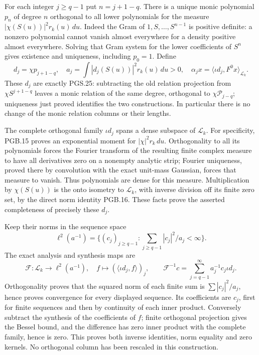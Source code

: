 For each integer $j\geq q-1$ put $n=j+1-q$. There is a unique monic
polynomial $p_n$ of degree $n$ orthogonal to all lower polynomials
for the measure $|\chi(S(u))|^2r_k(u)\,du$. Indeed the Gram of
$1,S,\ldots,S^{n-1}$ is positive definite: a nonzero polynomial
cannot vanish almost everywhere for a density positive almost
everywhere. Solving that Gram system for the lower coefficients of
$S^n$ gives existence and uniqueness, including $p_0=1$. Define
\[
 d_j=\chi p_{j+1-q},\quad
 a_j=\int|d_j(S(u))|^2r_k(u)\,du>0,\quad
 \alpha_jx=\langle\iota d_j,F^0x\rangle_{\mathscr L_k}.
\tag{PGRT.3}\label{GraphV2:eq:pgrt-relation-coefficients}
\]
These $d_j$ are exactly PGS.25: subtracting the old relation
projection from $\chi S^{j+1-q}$ leaves a monic relation of the
same degree, orthogonal to $\chi\mathcal P_{j-q}$; uniqueness
just proved identifies the two constructions. In particular
there is no change of the monic relation columns or their lengths.

The complete orthogonal family $\iota d_j$ spans a dense subspace
of $\mathscr L_k$. For specificity, PGB.15 proves an exponential
moment for $|\chi|^2r_k\,du$. Orthogonality to all its polynomials
forces the Fourier transform of the resulting finite complex
measure to have all derivatives zero on a nonempty analytic strip;
Fourier uniqueness, proved there by convolution with the exact
unit-mass Gaussian, forces that measure to vanish. Thus polynomials
are dense for this measure. Multiplication by $\chi(S(u))$ is
the onto isometry to $\mathscr L_k$, with inverse division off
its finite zero set, by the direct norm identity PGB.16. These
facts prove the asserted completeness of precisely these $d_j$.

Keep their norms in the sequence space
\[
 \ell^2(a^{-1})=
 \{(c_j)_{j\geq q-1}:\sum_{j\geq q-1}|c_j|^2/a_j<\infty\}.
\]
The exact analysis and synthesis maps are
\[
 \mathcal F:\mathscr L_k\longrightarrow\ell^2(a^{-1}),
 \quad f\longmapsto(\langle\iota d_j,f\rangle)_j,
 \qquad
 \mathcal F^{-1}c=\sum_{j=q-1}^{\infty}a_j^{-1}c_j\iota d_j.
\tag{PGRT.4}\label{GraphV2:eq:pgrt-analysis}
\]
Orthogonality proves that the squared norm of each finite sum is
$\sum|c_j|^2/a_j$, hence proves convergence for every displayed
sequence. Its coefficients are $c_j$, first for finite sequences
and then by continuity of each inner product. Conversely subtract
the synthesis of the coefficients of $f$; finite orthogonal
projection gives the Bessel bound, and the difference has zero
inner product with the complete family, hence is zero. This proves
both inverse identities, norm equality and zero kernels. No
orthogonal column has been rescaled in this construction.


